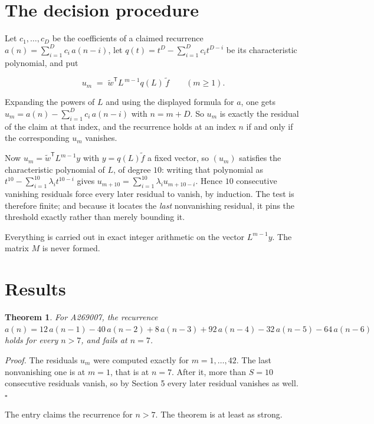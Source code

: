 \documentclass[11pt]{article}
\newtheorem{theorem}{Theorem}
\theoremstyle{definition}
\begin{document}
\section{The decision procedure}

Let $c_1,\dots,c_D$ be the coefficients of a claimed recurrence $a(n) = \sum_{i=1}^{D} c_i\,a(n-i)$, let $q(t) = t^{D} - \sum_{i=1}^{D} c_i t^{D-i}$ be its characteristic polynomial, and put

\[u_m \;=\; \tilde w^{\mathsf T} L^{\,m-1} q(L)\,\tilde f \qquad (m \ge 1).\]

Expanding the powers of $L$ and using the displayed formula for $a$, one gets $u_m = a(n) - \sum_{i=1}^{D} c_i\,a(n-i)$ with $n = m + D$. So $u_m$ is exactly the residual of the claim at that index, and the recurrence holds at an index $n$ if and only if the corresponding $u_m$ vanishes.

Now $u_m = \tilde w^{\mathsf T} L^{m-1} y$ with $y = q(L)\tilde f$ a fixed vector, so $(u_m)$ satisfies the characteristic polynomial of $L$, of degree $10$: writing that polynomial as $t^{10} - \sum_{i=1}^{10} \lambda_i t^{10-i}$ gives $u_{m+10} = \sum_{i=1}^{10} \lambda_i u_{m+10-i}$. Hence $10$ consecutive vanishing residuals force every later residual to vanish, by induction. The test is therefore finite; and because it locates the {\itshape last} nonvanishing residual, it pins the threshold exactly rather than merely bounding it.

Everything is carried out in exact integer arithmetic on the vector $L^{m-1}y$. The matrix $M$ is never formed.

\section{Results}

\begin{theorem} For A269007, the recurrence $a(n) = 12\,a(n-1) - 40\,a(n-2) + 8\,a(n-3) + 92\,a(n-4) - 32\,a(n-5) - 64\,a(n-6)$ holds for every $n > 7$, and fails at $n = 7$.\end{theorem}

{\itshape Proof.} The residuals $u_m$ were computed exactly for $m = 1,\dots,42$. The last nonvanishing one is at $m = 1$, that is at $n = 7$. After it, more than $S = 10$ consecutive residuals vanish, so by Section 5 every later residual vanishes as well. $\square$

The entry claims the recurrence for $n > 7$. The theorem is at least as strong.
\end{document}
